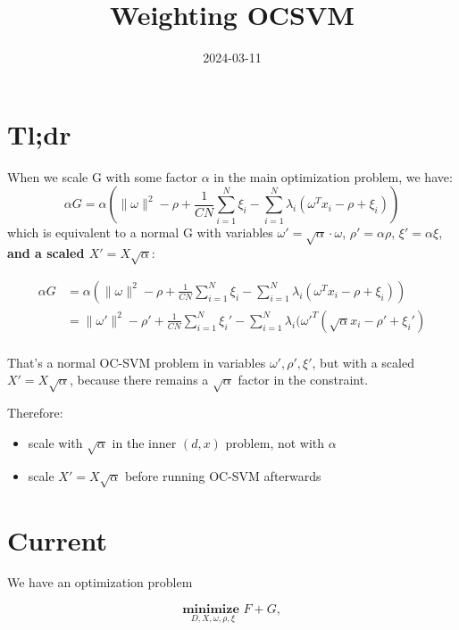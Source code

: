 \documentclass[
  letterpaper,
  DIV=11,
  numbers=noendperiod]{scrartcl}
\title{Weighting OCSVM}
\author{}
\date{2024-03-11}
\providecommand{\tightlist}{%
  \setlength{\itemsep}{0pt}\setlength{\parskip}{0pt}}\usepackage{longtable,booktabs,array}
\renewcommand*\contentsname{Table of contents}
\newcommand\contentsname{Table of contents}
\begin{document}
\maketitle

\renewcommand*\contentsname{Table of contents}
{
\hypersetup{linkcolor=}
\setcounter{tocdepth}{3}
\tableofcontents
}
\section{Tl;dr}\label{tldr}

When we scale G with some factor \(\alpha\) in the main optimization
problem, we have: \[
\alpha G = \alpha \left( \|\omega\|^2 - \rho + \frac{1}{CN} \sum_{i=1}^{N} \xi_i
- \sum_{i=1}^{N} \lambda_i (\omega^T x_i - \rho + \xi_i) \right)
\] which is equivalent to a normal G with variables
\(\omega' = \sqrt{\alpha} \cdot \omega\), \(\rho' = \alpha \rho\),
\(\xi' = \alpha \xi\), \textbf{and a scaled \(X' = X \sqrt{\alpha}\)}:

\[
\begin{align}
\alpha G &= \alpha \left( \|\omega\|^2 - \rho + \frac{1}{CN} \sum_{i=1}^{N} \xi_i
- \sum_{i=1}^{N} \lambda_i (\omega^T x_i - \rho + \xi_i) \right) \\
&= \|\omega'\|^2 - \rho' + \frac{1}{CN} \sum_{i=1}^{N} \xi_i' - \sum_{i=1}^{N} \lambda_i (\omega'^T (\sqrt{\alpha} x_i - \rho' + \xi_i') \\
\end{align}
\]

That's a normal OC-SVM problem in variables \(\omega', \rho', \xi'\),
but with a scaled \(X' = X \sqrt{\alpha}\), because there remains a
\(\sqrt{\alpha}\) factor in the constraint.

Therefore:

\begin{itemize}
\tightlist
\item
  scale with \(\sqrt{\alpha}\) in the inner \((d,x)\) problem, not with
  \(\alpha\)
\item
  scale \(X' = X \sqrt{\alpha}\) before running OC-SVM afterwards
\end{itemize}

\section{Current}\label{current}

We have an optimization problem

\[\underset{D, X, \omega, \rho, \xi}{\textbf{minimize  }} F + G,\]
\end{document}
